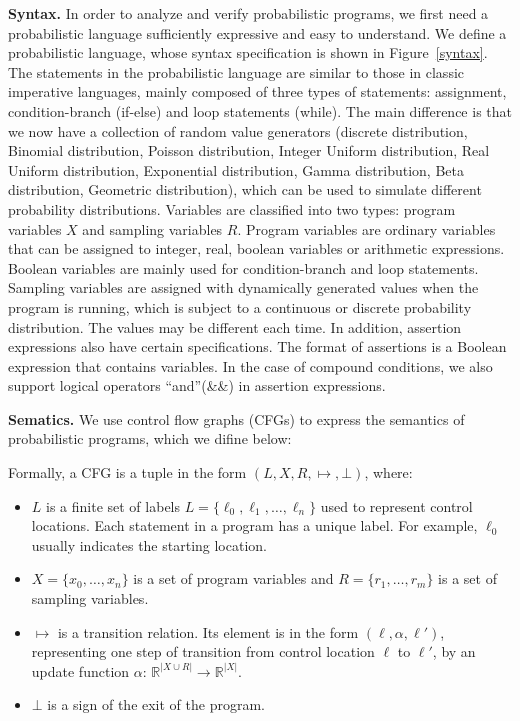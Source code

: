 \documentclass[runningheads]{llncs}
\begin{document}
\textbf{Syntax.} In order to analyze and verify probabilistic programs, we first need a probabilistic language sufficiently expressive and easy to understand. We define a probabilistic language, whose syntax specification is shown in Figure~\ref{syntax}. The statements in the probabilistic language are similar to those in classic imperative languages, mainly composed of three types of statements: assignment, condition-branch (if-else) and loop statements (while). The main difference is that we now have a collection of random value generators (discrete distribution, Binomial distribution, Poisson distribution, Integer Uniform distribution, Real Uniform distribution, Exponential distribution, Gamma distribution, Beta distribution, Geometric distribution), which can be used to simulate different probability distributions. Variables are classified into two types: program variables $X$ and sampling variables $R$. Program variables are ordinary variables that can be assigned to integer, real, boolean variables or arithmetic expressions. Boolean variables are mainly used for condition-branch and loop statements. Sampling variables are assigned with dynamically generated values when the program is running, which is subject to a continuous or discrete probability distribution. The values may be different each time. In addition, assertion expressions also have certain specifications. The format of assertions is a Boolean expression that contains variables. In the case of compound conditions, we also support logical operators ``and''(\&\&) in assertion expressions.

\textbf{Sematics.} We use control flow graphs (CFGs) to express the semantics of probabilistic programs, which we difine below: 

Formally, a CFG is a tuple in the form $(L,X,R,\mapsto,\bot)$, where:
\renewcommand{\labelitemi}{$\vcenter{\hbox{\tiny$\bullet$}}$}
\begin{itemize}
	\item $L$ is a finite set of labels $L=\{\ell_0,\ell_1,\dots,\ell_n\}$ used to represent control locations. Each statement in a program has a unique label. For example, $\ell_0$ usually indicates the starting location.
	
	\item $X=\{x_0,\dots,x_n\}$ is a set of program variables and $R=\{r_1,\dots,r_m\}$ is a set of sampling variables.
	
	\item $\mapsto$ is a transition relation. Its element is in the form $(\ell,\alpha,\ell')$, representing one step of transition from control location $\ell$ to $\ell'$, by an update function $\alpha$: $\mathbb{R}^{|X\cup R|}\to \mathbb{R}^{|X|}$.
	
	\item $\bot$ is a sign of the exit of the program.
\end{itemize}
\end{document}
